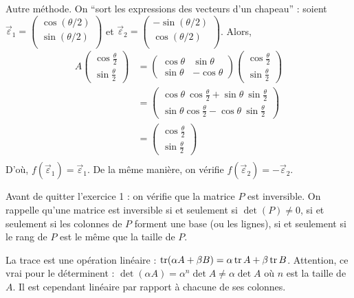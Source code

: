 \begin{exo}
	Autre méthode. On ``sort les expressions des vecteurs d'un chapeau'' : soient $\vec{\varepsilon}_1 = \begin{pmatrix}
		\cos(\theta/2)\\
		\sin(\theta/2)\\
	\end{pmatrix}$\/ et $\vec{\varepsilon}_2 = \begin{pmatrix}
		-\sin(\theta / 2)\\
		\cos(\theta / 2)\\
	\end{pmatrix}$. Alors,
	\begin{align*}
		A \begin{pmatrix}
			\cos \frac{\theta}{2}\\[2mm]
			\sin\frac{\theta}{2}
		\end{pmatrix} &= \begin{pmatrix}
		\cos\theta&\sin\theta\\
		\sin\theta&-\cos\theta
		\end{pmatrix} \begin{pmatrix}
			\cos \frac{\theta}{2} \\[2mm]
			\sin \frac{\theta}{2}
		\end{pmatrix} \\
		&= \begin{pmatrix}
			\cos \theta\:\cos \frac{\theta}{2} + \sin \theta\:\sin \frac{\theta}{2} \\[2mm]
			\sin \theta \cos \frac{\theta}{2} - \cos \theta\:\sin\frac{\theta}{2}
		\end{pmatrix} \\
		&= \begin{pmatrix}
			\cos\frac{\theta}{2}\\[2mm]
			\sin \frac{\theta}{2}
		\end{pmatrix} \\
	\end{align*}
	D'où, $f(\vec{\varepsilon}_1) = \vec{\varepsilon}_1$. De la même manière, on vérifie $f(\vec{\varepsilon}_2) = -\vec{\varepsilon}_2$.

	Avant de quitter l'{\sc exercice 1}\/ : on vérifie que la matrice $P$\/ est inversible. On rappelle qu'une matrice est inversible si et seulement si $\det(P) \neq 0$, si et seulement si les colonnes de $P$\/ forment une base (ou les lignes), si et seulement si le rang de $P$\/ est le même que la taille de $P$.
\end{exo}

La trace est une opération linéaire : $\operatorname{tr}(\alpha A + \beta B) = \alpha\operatorname{tr} A+ \beta\operatorname{tr} B$. Attention, ce  vrai pour le déterminent : $\det(\alpha A) = \alpha^n \det A \neq \alpha\det A$\/ où $n$\/ est la taille de $A$. Il est cependant linéaire par rapport à chacune de ses colonnes.

